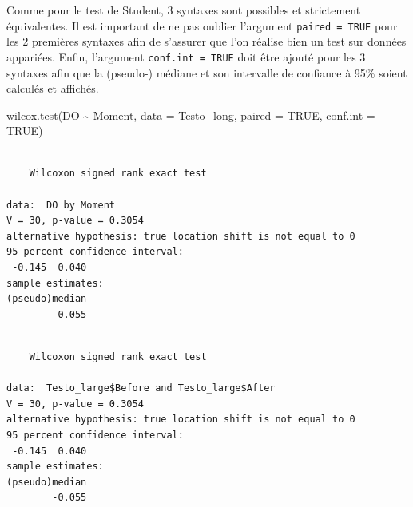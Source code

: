 \documentclass[
  a4paper,
  DIV=11,
  numbers=noendperiod,
  oneside]{scrreprt}
\newenvironment{Shaded}{}{}
\newcommand{\AttributeTok}[1]{\textcolor[rgb]{0.84,0.23,0.29}{#1}}
\newcommand{\ConstantTok}[1]{\textcolor[rgb]{0.00,0.36,0.77}{#1}}
\newcommand{\DecValTok}[1]{\textcolor[rgb]{0.00,0.36,0.77}{#1}}
\newcommand{\FunctionTok}[1]{\textcolor[rgb]{0.44,0.26,0.76}{#1}}
\newcommand{\NormalTok}[1]{\textcolor[rgb]{0.14,0.16,0.18}{#1}}
\newcommand{\SpecialCharTok}[1]{\textcolor[rgb]{0.00,0.36,0.77}{#1}}
\begin{document}
Comme pour le test de Student, 3 syntaxes sont possibles et strictement
équivalentes. Il est important de ne pas oublier l'argument
\texttt{paired\ =\ TRUE} pour les 2 premières syntaxes afin de s'assurer
que l'on réalise bien un test sur données appariées. Enfin, l'argument
\texttt{conf.int\ =\ TRUE} doit être ajouté pour les 3 syntaxes afin que
la (pseudo-) médiane et son intervalle de confiance à 95\% soient
calculés et affichés.

\begin{Shaded}
\begin{Highlighting}[]
\FunctionTok{wilcox.test}\NormalTok{(DO }\SpecialCharTok{\textasciitilde{}}\NormalTok{ Moment, }\AttributeTok{data =}\NormalTok{ Testo\_long, }\AttributeTok{paired =} \ConstantTok{TRUE}\NormalTok{, }\AttributeTok{conf.int =} \ConstantTok{TRUE}\NormalTok{)}
\end{Highlighting}
\end{Shaded}

\begin{verbatim}

    Wilcoxon signed rank exact test

data:  DO by Moment
V = 30, p-value = 0.3054
alternative hypothesis: true location shift is not equal to 0
95 percent confidence interval:
 -0.145  0.040
sample estimates:
(pseudo)median 
        -0.055 
\end{verbatim}

\begin{Shaded}
\end{Shaded}

\begin{verbatim}

    Wilcoxon signed rank exact test

data:  Testo_large$Before and Testo_large$After
V = 30, p-value = 0.3054
alternative hypothesis: true location shift is not equal to 0
95 percent confidence interval:
 -0.145  0.040
sample estimates:
(pseudo)median 
        -0.055 
\end{verbatim}

\begin{Shaded}
\end{Shaded}
\end{document}
